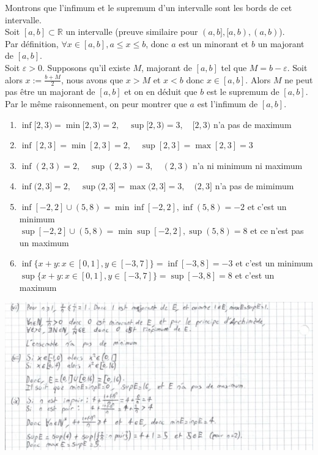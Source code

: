 \documentclass[a4paper, 10pt]{report}
\begin{document}
	\colorbox{solution}{\begin{minipage}{0.9\textwidth}
		Montrons que l'infimum et le supremum d'un intervalle sont les
		bords de cet intervalle.\\
		
		Soit $[a, b] \subset \mathbb{R}$ un intervalle (preuve similaire
		pour $(a, b], [a, b), (a, b)$).\\
		Par définition, $\forall x \in [a, b], a \leq x \leq b$, donc
		$a$ est un minorant et $b$ un majorant de $[a, b]$.\\
		
		Soit $\varepsilon > 0$. Supposons qu'il existe $M$, majorant de
		$[a, b]$ tel que $M = b - \varepsilon$. Soit alors 
		$x := \frac{b+M}{2}$, nous avons que $x > M$ et $x < b$ donc
		$x \in [a, b]$. Alors $M$ ne peut pas être un majorant de $[a, b]$
		et on en déduit que $b$ est le supremum de $[a, b]$.\\
		
		Par le même raisonnement, on peur montrer que $a$ est l'infimum de
		$[a, b]$.\\
		
		\begin{enumerate}[label=\arabic*.]
			\item $\inf[2, 3) = \min[2, 3) = 2, \quad
				\sup[2, 3) = 3, \quad [2, 3)$ n'a pas de maximum
			\item $\inf[2, 3] = \min[2, 3] = 2, \quad
				\sup[2, 3] = \max[2, 3] = 3$
			\item $\inf(2, 3)  = 2,\quad
				\sup(2, 3) = 3, \quad (2, 3)$ n'a ni minimum ni maximum 
			\item $\inf(2, 3] = 2, \quad
				\sup(2, 3] = \max(2, 3] = 3, \quad (2, 3]$ n'a pas de mimimum
			\item $\inf[-2, 2] \cup (5, 8) = \min{\inf[-2, 2], \inf(5, 8)}
				= -2$ et c'est un minimum\\
			$\sup[-2, 2] \cup (5, 8) = \min{\sup[-2, 2], \sup(5, 8)}
				= 8$ et ce n'est pas un maximum
			\item $\inf\{x + y : x \in [0,1], y \in [-3,7]\} = \inf[-3,8]
				= -3$ et c'est un minimum\\
			$\sup\{x + y : x \in [0,1], y \in [-3,7]\} = \sup[-3,8]
				= 8$ et c'est un maximum
		\end{enumerate}
		
		\includegraphics{ex01.jpg}
	\end{minipage}}
\end{document}
